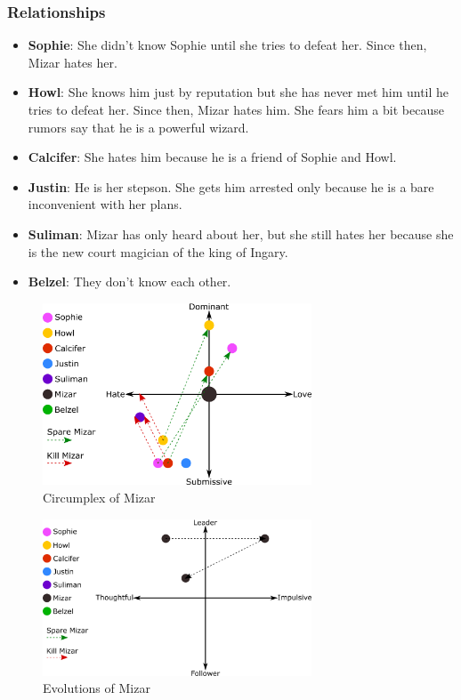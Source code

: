 \subsubsection*{Relationships}
\begin{itemize}
\item \textbf{Sophie}: She didn’t know Sophie until she tries to defeat her. Since then, Mizar hates her.
\item \textbf{Howl}: She knows him just by reputation but she has never met him until he tries to defeat her. Since then, Mizar hates him. She fears him a bit because rumors say that he is a powerful wizard.
\item \textbf{Calcifer}: She hates him because he is a friend of Sophie and Howl.
\item \textbf{Justin}: He is her stepson. She gets him arrested only because he is a bare  inconvenient with her plans. 
\item \textbf{Suliman}: Mizar has only heard about her, but she still hates her because she is the new court magician of the king of Ingary.
\item \textbf{Belzel}: They don't know each other.
\end{itemize}

\begin{figure}[H]
  \centering
  \includegraphics[width=8cm]{Images/Diagrams/Circumplexes/mizarCircumplex}
  \caption{Circumplex of Mizar}
\end{figure}

\begin{figure}[H]
  \centering
  \includegraphics[width=8cm]{Images/Diagrams/Evolutions/mizarEvolution}
  \caption{Evolutions of Mizar}
\end{figure}

